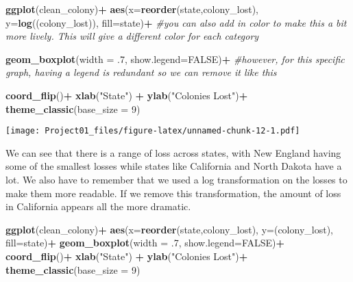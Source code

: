 \documentclass[
]{article}
\newenvironment{Shaded}{\begin{snugshade}}{\end{snugshade}}
\newcommand{\AttributeTok}[1]{\textcolor[rgb]{0.13,0.29,0.53}{#1}}
\newcommand{\CommentTok}[1]{\textcolor[rgb]{0.56,0.35,0.01}{\textit{#1}}}
\newcommand{\ConstantTok}[1]{\textcolor[rgb]{0.56,0.35,0.01}{#1}}
\newcommand{\DecValTok}[1]{\textcolor[rgb]{0.00,0.00,0.81}{#1}}
\newcommand{\FunctionTok}[1]{\textcolor[rgb]{0.13,0.29,0.53}{\textbf{#1}}}
\newcommand{\NormalTok}[1]{#1}
\newcommand{\SpecialCharTok}[1]{\textcolor[rgb]{0.81,0.36,0.00}{\textbf{#1}}}
\newcommand{\StringTok}[1]{\textcolor[rgb]{0.31,0.60,0.02}{#1}}
\begin{document}
\begin{Shaded}
\begin{Highlighting}[]
\FunctionTok{ggplot}\NormalTok{(clean\_colony)}\SpecialCharTok{+}  
  \FunctionTok{aes}\NormalTok{(}\AttributeTok{x=}\FunctionTok{reorder}\NormalTok{(state,colony\_lost), }\AttributeTok{y=}\FunctionTok{log}\NormalTok{((colony\_lost)), }\AttributeTok{fill=}\NormalTok{state)}\SpecialCharTok{+} \CommentTok{\#you can also add in color to make this a bit more lively. This will give a different color for each category}
  
  \FunctionTok{geom\_boxplot}\NormalTok{(}\AttributeTok{width =}\NormalTok{ .}\DecValTok{7}\NormalTok{, }\AttributeTok{show.legend=}\ConstantTok{FALSE}\NormalTok{)}\SpecialCharTok{+} \CommentTok{\#however, for this specific graph, having a legend is redundant so we can remove it like this}
  
  \FunctionTok{coord\_flip}\NormalTok{()}\SpecialCharTok{+} 
  \FunctionTok{xlab}\NormalTok{(}\StringTok{"State"}\NormalTok{) }\SpecialCharTok{+}
  \FunctionTok{ylab}\NormalTok{(}\StringTok{"Colonies Lost"}\NormalTok{)}\SpecialCharTok{+}
  \FunctionTok{theme\_classic}\NormalTok{(}\AttributeTok{base\_size =} \DecValTok{9}\NormalTok{)}
\end{Highlighting}
\end{Shaded}

\texttt{[image: Project01\_files/figure-latex/unnamed-chunk-12-1.pdf]}

We can see that there is a range of loss across states, with New England
having some of the smallest losses while states like California and
North Dakota have a lot. We also have to remember that we used a log
transformation on the losses to make them more readable. If we remove
this transformation, the amount of loss in California appears all the
more dramatic.

\begin{Shaded}
\begin{Highlighting}[]
\FunctionTok{ggplot}\NormalTok{(clean\_colony)}\SpecialCharTok{+}  
  \FunctionTok{aes}\NormalTok{(}\AttributeTok{x=}\FunctionTok{reorder}\NormalTok{(state,colony\_lost), }\AttributeTok{y=}\NormalTok{(colony\_lost), }\AttributeTok{fill=}\NormalTok{state)}\SpecialCharTok{+}
  \FunctionTok{geom\_boxplot}\NormalTok{(}\AttributeTok{width =}\NormalTok{ .}\DecValTok{7}\NormalTok{, }\AttributeTok{show.legend=}\ConstantTok{FALSE}\NormalTok{)}\SpecialCharTok{+}
  \FunctionTok{coord\_flip}\NormalTok{()}\SpecialCharTok{+} 
  \FunctionTok{xlab}\NormalTok{(}\StringTok{"State"}\NormalTok{) }\SpecialCharTok{+}
  \FunctionTok{ylab}\NormalTok{(}\StringTok{"Colonies Lost"}\NormalTok{)}\SpecialCharTok{+}
  \FunctionTok{theme\_classic}\NormalTok{(}\AttributeTok{base\_size =} \DecValTok{9}\NormalTok{)}
\end{Highlighting}
\end{Shaded}
\end{document}
